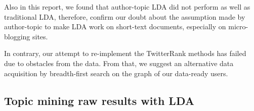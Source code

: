 \documentclass[11pt]{article}
\begin{document}
Also in this report, we found that author-topic LDA did not perform as well as traditional LDA, therefore, confirm our doubt about the assumption made by author-topic to make LDA work on short-text documents, especially on micro-blogging sites.

In contrary, our attempt to re-implement the TwitterRank methods has failed due to obstacles from the data. From that, we suggest an alternative data acquisition by breadth-first search on the graph of our data-ready users.




\begin{appendices}

\section{Topic mining raw results with LDA}


\end{appendices}
\end{document}
